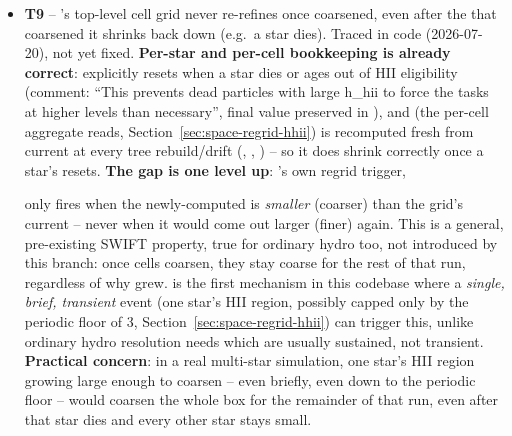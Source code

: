 \begin{itemize}
  \item[$\square$] \textbf{T9} -- 's top-level
    cell grid never re-refines once coarsened, even after the
     that coarsened it shrinks back down (e.g.\ a star
    dies). Traced in code (2026-07-20), not yet fixed.
    \textbf{Per-star and per-cell bookkeeping is already correct}:
     explicitly resets
     when a star dies or ages out of HII
    eligibility (comment: ``This prevents dead particles with large
    h\_hii to force the tasks at higher levels than necessary'',
    final value preserved in
    ), and
     (the per-cell aggregate
     reads, Section~\ref{sec:space-regrid-hhii}) is
    recomputed fresh from current  at every
    tree rebuild/drift (, ,
    ) -- so it does shrink correctly once a
    star's  resets. \textbf{The gap is one level up}:
    's own regrid trigger,
    \begin{quote}
    \end{quote}
    only fires when the newly-computed  is \emph{smaller}
    (coarser) than the grid's current  -- never when it
    would come out larger (finer) again. This is a general,
    pre-existing SWIFT property, true for ordinary hydro 
    too, not introduced by this branch: once cells coarsen, they stay
    coarse for the rest of that run, regardless of why 
    grew.  is the first mechanism in this codebase where a
    \emph{single, brief, transient} event (one star's HII region,
    possibly capped only by the periodic floor of 3,
    Section~\ref{sec:space-regrid-hhii}) can trigger this, unlike ordinary
    hydro resolution needs which are usually sustained, not transient.
    \textbf{Practical concern}: in a real multi-star simulation, one
    star's HII region growing large enough to coarsen  --
    even briefly, even down to the periodic floor -- would coarsen the
    whole box for the remainder of that run, even after that star dies
    and every other star stays small.


\end{itemize}
